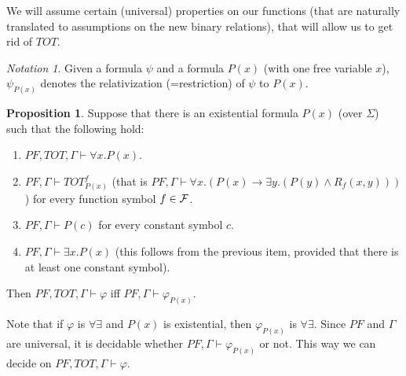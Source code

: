 \documentclass[11pt,a4paper,oneside]{article}
\theoremstyle{definition}
\newtheorem{proposition}[definition]{Proposition}
\theoremstyle{remark}
\newtheorem{notation}[definition]{Notation}
\newcommand{\vd}{\vdash}
\newcommand{\fe}{\varphi}
\begin{document}
We will assume certain (universal) properties on our functions (that are naturally translated to assumptions on the new binary relations), that will allow us to get rid of $TOT$.

\begin{notation}
Given a formula $\psi$ and a formula $P(x)$ (with one free variable $x$),
$\psi_{P(x)}$ denotes the relativization (=restriction) of $\psi$ to $P(x)$.
\end{notation}

\begin{proposition}
\label{function_elimination_proposition}
Suppose that there is an existential formula $P(x)$ (over $\Sigma$) such that the following hold:
\begin{enumerate}
\item $ PF , TOT , \Gamma\vdash \forall x. P(x)$.
\item $PF , \Gamma \vdash TOT^f_{P(x)}$ (that is $ PF ,\Gamma \vdash \forall x. \left( P(x) \to \exists y. \left(P(y) \land R_f(x,y)\right)\right)$) for every function symbol $f\in{\cal F}$.
\item $PF, \Gamma \vdash P(c)$ for every constant symbol $c$.
\item $PF, \Gamma \vdash \exists x. P(x)$
(this follows from the previous item, provided that there is at least one constant symbol).
\end{enumerate}
Then $PF, TOT, \Gamma \vd \fe$ iff
$PF, \Gamma \vd \fe_{P(x)}$.
\end{proposition}

Note that if $\fe$ is $\forall\exists$ and $P(x)$ is existential, then $\fe_{P(x)}$ is $\forall\exists$. Since $PF$ and $\Gamma$ are universal, it is decidable whether $PF, \Gamma\vd \fe_{P(x)}$ or not. This way we can decide on $PF, TOT, \Gamma \vd \fe$.
\end{document}
